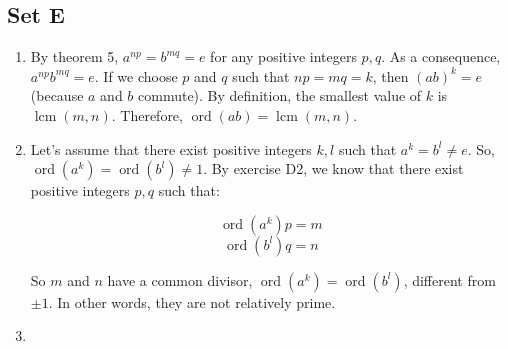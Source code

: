 \documentclass{article}
\DeclareMathOperator{\ord}{ord}
\DeclareMathOperator{\lcm}{lcm}
\begin{document}
\subsection{Set E}
\begin{enumerate}
    \item By theorem 5, $ a^{np} = b^{mq} = e $ for any positive integers $ p, q $. As a consequence, $ a^{np}b^{mq} = e $. If we choose $ p $ and $ q $ such that $ np = mq = k $, then $ (ab)^k = e $ (because $ a $ and $ b $ commute). By definition, the smallest value of $ k $ is $ \lcm(m, n) $. Therefore, $ \ord(ab) = \lcm(m, n) $.    

    \item Let's assume that there exist positive integers $ k, l $ such that $ a^k = b^l \ne e $. So, $ \ord(a^k) = \ord(b^l) \ne 1 $. By exercise D2, we know that there exist positive integers $ p, q $ such that:

    $$ \ord(a^k)p = m $$
    $$ \ord(b^l)q = n $$

    So $ m $ and $ n $ have a common divisor, $ \ord(a^k) = \ord(b^l) $, different from $ \pm 1 $. In other words, they are not relatively prime.

    \item 
\end{enumerate}
\end{document}
